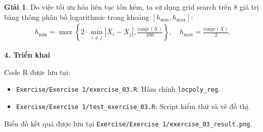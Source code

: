 \documentclass[12pt,xcolor=dvipsnames]{article}
\theoremstyle{definition}
\newtheorem*{giai}{Giải}
\begin{document}
\begin{giai}
Do việc tối ưu hóa liên tục tốn kém, ta sử dụng grid search trên 8 giá trị băng thông phân bố logarithmic trong khoảng $[h_{\min}, h_{\max}]$:
\begin{align}
h_{\min} = \max\left\{2\cdot\min_{i\ne j}|X_i-X_j|, \frac{\text{range}(X)}{100}\right\}, \quad
h_{\max} = \frac{\text{range}(X)}{2}.
\end{align}

\textbf{4. Triển khai}

Code R được lưu tại:
\begin{itemize}
    \item \texttt{Exercise/Exercise 1/exercise\_03.R}: Hàm chính \texttt{locpoly\_reg}.
    \item \texttt{Exercise/Exercise 1/test\_exercise\_03.R}: Script kiểm thử và vẽ đồ thị.
\end{itemize}

Biểu đồ kết quả được lưu tại \texttt{Exercise/Exercise 1/exercise\_03\_result.png}.
\end{giai}
\end{document}
